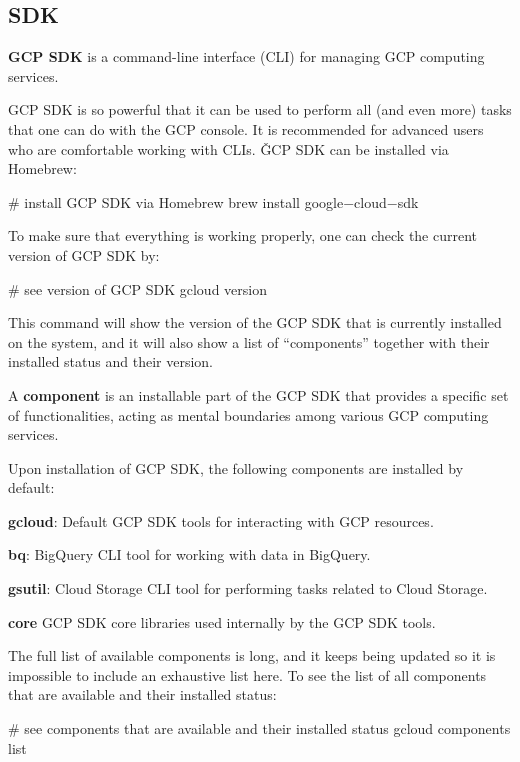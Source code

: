 \subsection{SDK}

\textbf{GCP SDK} is a command-line interface (CLI) for managing GCP computing services.
\ed

GCP SDK is so powerful that it can be used to perform all (and even more) tasks that one can do with the GCP console.
It is recommended for advanced users who are comfortable working with CLIs. \v

GCP SDK can be installed via Homebrew:
\begin{bash}
# install GCP SDK via Homebrew
brew install google$-$cloud$-$sdk
\end{bash}

To make sure that everything is working properly, one can check the current version of GCP SDK by:
\begin{bash}
# see version of GCP SDK
gcloud version
\end{bash}

This command will show the version of the GCP SDK that is currently installed on the system, and it will also show a
list of ``components'' together with their installed status and their version.

\bd[Component]
A \textbf{component} is an installable part of the GCP SDK that provides a specific set of functionalities, acting as
mental boundaries among various GCP computing services.
\ed

Upon installation of GCP SDK, the following components are installed by default:
\bit
\item \textbf{gcloud}: Default GCP SDK tools for interacting with GCP resources.
\item \textbf{bq}: BigQuery CLI tool for working with data in BigQuery.
\item \textbf{gsutil}: Cloud Storage CLI tool for performing tasks related to Cloud Storage.
\item \textbf{core} GCP SDK core libraries used internally by the GCP SDK tools.
\eit

The full list of available components is long, and it keeps being updated so it is impossible to include an exhaustive
list here. To see the list of all components that are available and their installed status:
\begin{bash}
# see components that are available and their installed status
gcloud components list
\end{bash}


